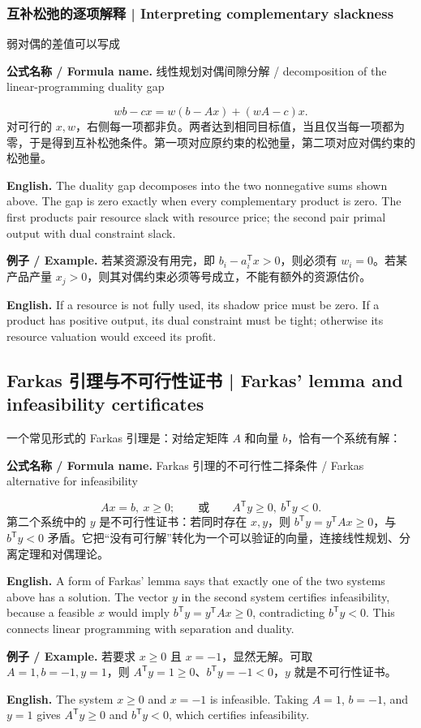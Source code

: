 \documentclass[UTF8,11pt,a4paper]{ctexart}
\newcommand{\EN}[1]{\par\noindent \textbf{English.} #1\par}
\newcommand{\FORMULA}[2]{\par\noindent\textbf{公式名称 / Formula name.} #1 / #2\par}
\newcommand{\EX}[2]{\par\noindent \textbf{例子 / Example.} #1\par\EN{#2}}
\begin{document}
\subsubsection{互补松弛的逐项解释 | Interpreting complementary slackness}
\noindent 弱对偶的差值可以写成
\FORMULA{线性规划对偶间隙分解}{decomposition of the linear-programming duality gap}
\[
wb-cx
=w(b-Ax)+(wA-c)x.
\]
对可行的 $x,w$，右侧每一项都非负。两者达到相同目标值，当且仅当每一项都为零，于是得到互补松弛条件。第一项对应原约束的松弛量，第二项对应对偶约束的松弛量。
\EN{The duality gap decomposes into the two nonnegative sums shown above. The gap is zero exactly when every complementary product is zero. The first products pair resource slack with resource price; the second pair primal output with dual constraint slack.}
\EX{若某资源没有用完，即 $b_i-a_i^{\mathsf T}x>0$，则必须有 $w_i=0$。若某产品产量 $x_j>0$，则其对偶约束必须等号成立，不能有额外的资源估价。}{If a resource is not fully used, its shadow price must be zero. If a product has positive output, its dual constraint must be tight; otherwise its resource valuation would exceed its profit.}

\subsection{Farkas 引理与不可行性证书 | Farkas' lemma and infeasibility certificates}
\noindent 一个常见形式的 Farkas 引理是：对给定矩阵 $A$ 和向量 $b$，恰有一个系统有解：
\FORMULA{Farkas 引理的不可行性二择条件}{Farkas alternative for infeasibility}
\[
Ax=b,\ x\ge0;
\qquad\text{或}\qquad
A^{\mathsf T}y\ge0,\ b^{\mathsf T}y<0.
\]
第二个系统中的 $y$ 是不可行性证书：若同时存在 $x,y$，则 $b^{\mathsf T}y=y^{\mathsf T}Ax\ge0$，与 $b^{\mathsf T}y<0$ 矛盾。它把“没有可行解”转化为一个可以验证的向量，连接线性规划、分离定理和对偶理论。
\EN{A form of Farkas' lemma says that exactly one of the two systems above has a solution. The vector $y$ in the second system certifies infeasibility, because a feasible $x$ would imply $b^{\mathsf T}y=y^{\mathsf T}Ax\ge0$, contradicting $b^{\mathsf T}y<0$. This connects linear programming with separation and duality.}
\EX{若要求 $x\ge0$ 且 $x=-1$，显然无解。可取 $A=1,b=-1,y=1$，则 $A^{\mathsf T}y=1\ge0$、$b^{\mathsf T}y=-1<0$，$y$ 就是不可行性证书。}{The system $x\ge0$ and $x=-1$ is infeasible. Taking $A=1$, $b=-1$, and $y=1$ gives $A^{\mathsf T}y\ge0$ and $b^{\mathsf T}y<0$, which certifies infeasibility.}
\end{document}
